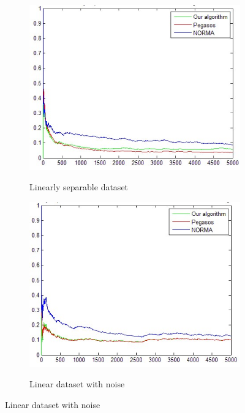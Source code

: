\begin{figure}[t]
    \centering
\begin{subfigure}[b]{.45\linewidth}
       \includegraphics[width=0.9\linewidth]{PN_Lin_Lin}
\label{LL}
        \caption{Linearly separable dataset}
      \end{subfigure}%
\hspace{.01\linewidth}
\begin{subfigure}[b]{.45\linewidth}
	 \includegraphics[width=0.9\linewidth]{PN_Noise_Lin.jpg}
       \label{NL}
      \caption{Linear dataset with noise}
  
	 \end{subfigure}%


\end{figure}
